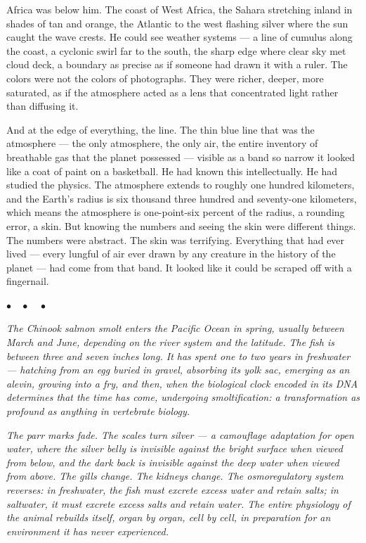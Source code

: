 \documentclass[12pt, letterpaper]{article}
\begin{document}
Africa was below him. The coast of West Africa, the Sahara stretching inland in shades of tan and orange, the Atlantic to the west flashing silver where the sun caught the wave crests. He could see weather systems --- a line of cumulus along the coast, a cyclonic swirl far to the south, the sharp edge where clear sky met cloud deck, a boundary as precise as if someone had drawn it with a ruler. The colors were not the colors of photographs. They were richer, deeper, more saturated, as if the atmosphere acted as a lens that concentrated light rather than diffusing it.

And at the edge of everything, the line. The thin blue line that was the atmosphere --- the only atmosphere, the only air, the entire inventory of breathable gas that the planet possessed --- visible as a band so narrow it looked like a coat of paint on a basketball. He had known this intellectually. He had studied the physics. The atmosphere extends to roughly one hundred kilometers, and the Earth's radius is six thousand three hundred and seventy-one kilometers, which means the atmosphere is one-point-six percent of the radius, a rounding error, a skin. But knowing the numbers and seeing the skin were different things. The numbers were abstract. The skin was terrifying. Everything that had ever lived --- every lungful of air ever drawn by any creature in the history of the planet --- had come from that band. It looked like it could be scraped off with a fingernail.

\begin{center}
$\bullet\quad\bullet\quad\bullet$
\end{center}

\emph{The Chinook salmon smolt enters the Pacific Ocean in spring, usually between March and June, depending on the river system and the latitude. The fish is between three and seven inches long. It has spent one to two years in freshwater --- hatching from an egg buried in gravel, absorbing its yolk sac, emerging as an alevin, growing into a fry, and then, when the biological clock encoded in its DNA determines that the time has come, undergoing smoltification: a transformation as profound as anything in vertebrate biology.}

\emph{The parr marks fade. The scales turn silver --- a camouflage adaptation for open water, where the silver belly is invisible against the bright surface when viewed from below, and the dark back is invisible against the deep water when viewed from above. The gills change. The kidneys change. The osmoregulatory system reverses: in freshwater, the fish must excrete excess water and retain salts; in saltwater, it must excrete excess salts and retain water. The entire physiology of the animal rebuilds itself, organ by organ, cell by cell, in preparation for an environment it has never experienced.}
\end{document}
